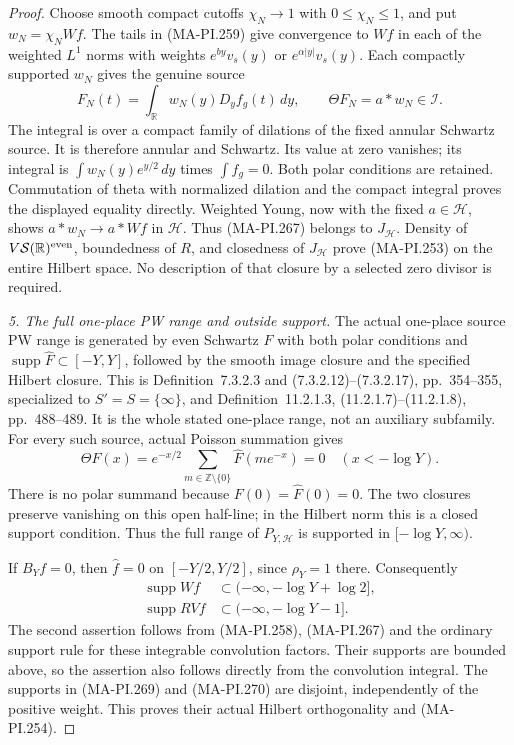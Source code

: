 \begin{proof}
Choose smooth compact cutoffs \(\chi_N\to1\) with
\(0\le\chi_N\le1\), and put \(w_N=\chi_NWf\).
The tails in (MA-PI.259) give convergence to \(Wf\)
in each of the weighted \(L^1\) norms with weights
\(e^{by}v_s(y)\) or \(e^{\alpha|y|}v_s(y)\).
Each compactly supported \(w_N\) gives the genuine source
\[
 F_N(t)=\int_{\mathbb R}w_N(y)D_yf_g(t)\,dy,
 \qquad
 \Theta F_N=a*w_N\in\mathscr I.
 \tag{MA-PI.268}
\]
The integral is over a compact family of dilations of
the fixed annular Schwartz source.  It is therefore
annular and Schwartz.  Its value at zero vanishes;
its integral is \(\int w_N(y)e^{y/2}\,dy\) times
\(\int f_g=0\).  Both polar conditions are retained.
Commutation of theta with normalized dilation and the
compact integral proves the displayed equality directly.
Weighted Young, now with the fixed \(a\in\mathscr H\),
shows \(a*w_N\to a*Wf\) in \(\mathscr H\).
Thus (MA-PI.267) belongs to \(J_{\mathscr H}\).
Density of \(V\mathcal S(\mathbb R)^{\rm even}\),
boundedness of \(R\), and closedness of \(J_{\mathscr H}\)
prove (MA-PI.253) on the entire Hilbert space.
No description of that closure by a selected zero divisor
is required.

\emph{5. The full one-place PW range and outside support.}
The actual one-place source PW range is generated by even
Schwartz \(F\) with both polar conditions and
\(\operatorname{supp}\widehat F\subset[-Y,Y]\), followed
by the smooth image closure and the specified Hilbert
closure.  This is Definition~7.3.2.3 and
(7.3.2.12)--(7.3.2.17), pp.~354--355, specialized to
\(S'=S=\{\infty\}\), and Definition~11.2.1.3,
(11.2.1.7)--(11.2.1.8), pp.~488--489.
It is the whole stated one-place range, not an auxiliary
subfamily.  For every such source, actual Poisson summation
gives
\[
 \Theta F(x)=e^{-x/2}
         \sum_{m\in\mathbb Z\setminus\{0\}}
                             \widehat F(me^{-x})=0
                                  \quad(x<-\log Y).
 \tag{MA-PI.269}
\]
There is no polar summand because \(F(0)=\widehat F(0)=0\).
The two closures preserve vanishing on this open half-line;
in the Hilbert norm this is a closed support condition.
Thus the full range of \(P_{Y,\mathscr H}\) is supported
in \([-\log Y,\infty)\).

If \(B_Yf=0\), then \(\widehat f=0\) on
\([-Y/2,Y/2]\), since \(\rho_Y=1\) there.  Consequently
\[
 \begin{aligned}
 \operatorname{supp}Wf
   &\subset(-\infty,-\log Y+\log2],\\
 \operatorname{supp}RVf
   &\subset(-\infty,-\log Y-1].
 \end{aligned}
 \tag{MA-PI.270}
\]
The second assertion follows from (MA-PI.258), (MA-PI.267)
and the ordinary support rule for these integrable
convolution factors.  Their supports are bounded above,
so the assertion also follows directly from the convolution
integral.  The supports in (MA-PI.269) and (MA-PI.270)
are disjoint, independently of the positive weight.
This proves their actual Hilbert orthogonality and (MA-PI.254).


\end{proof}
